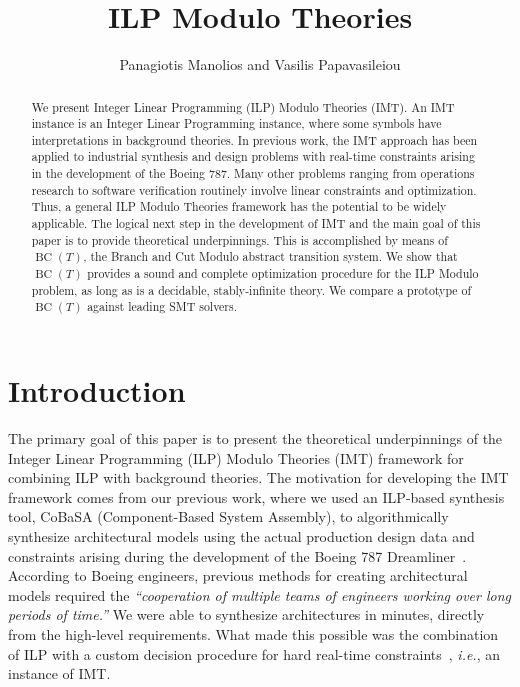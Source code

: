 \documentclass{llncs}
\newcommand{\cobasa}[0]{\textsf{CoBaSA}}
\newcommand{\ie}[0]{\emph{i.e.}, }
\newcommand{\bct}[0]{\ensuremath{\operatorname{BC}(T)}}
\begin{document}
\author{Panagiotis Manolios and Vasilis Papavasileiou}


\title{ILP Modulo Theories}

\maketitle

\begin{abstract}
  We present Integer Linear Programming (ILP) Modulo Theories
  (IMT). An IMT instance is an Integer Linear Programming instance,
  where some symbols have interpretations in background theories.  In
  previous work, the IMT approach has been applied to industrial
  synthesis and design problems with real-time constraints arising in
  the development of the Boeing 787. Many other problems ranging from
  operations research to software verification routinely involve
  linear constraints and optimization. Thus, a general ILP Modulo
  Theories framework has the potential to be widely applicable.  The
  logical next step in the development of IMT and the main goal of
  this paper is to provide theoretical underpinnings.  This is
  accomplished by means of \bct{}, the Branch and Cut Modulo 
  abstract transition system. We show that \bct{} provides a sound and
  complete optimization procedure for the ILP Modulo  problem, as
  long as  is a decidable, stably-infinite theory. We compare a
  prototype of \bct{} against leading SMT solvers.
\end{abstract}






\section{Introduction}

The primary goal of this paper is to present the theoretical
underpinnings of the Integer Linear Programming (ILP) Modulo Theories
(IMT) framework for combining ILP with background theories. The
motivation for developing the IMT framework comes from our previous
work, where we used an ILP-based synthesis tool, \cobasa{}
(Component-Based System Assembly), to algorithmically synthesize
architectural models using the actual production design data and
constraints arising during the development of the Boeing 787
Dreamliner~\cite{hmp11}. According to Boeing engineers, previous
methods for creating architectural models required the
\emph{``cooperation of multiple teams of engineers working over long
  periods of time.''} We were able to synthesize architectures in
minutes, directly from the high-level requirements. What made this
possible was the combination of ILP with a custom decision procedure
for hard real-time constraints~\cite{hmp11}, \ie an instance of IMT.
\end{document}
